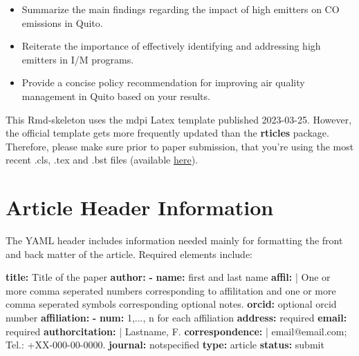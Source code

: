 \documentclass[atmosphere,article,submit,moreauthors,pdftex]{Definitions/mdpi}
\newenvironment{Shaded}{\begin{snugshade}}{\end{snugshade}}
\newcommand{\AttributeTok}[1]{\textcolor[rgb]{0.13,0.29,0.53}{#1}}
\newcommand{\CharTok}[1]{\textcolor[rgb]{0.31,0.60,0.02}{#1}}
\newcommand{\FunctionTok}[1]{\textcolor[rgb]{0.13,0.29,0.53}{\textbf{#1}}}
\newcommand{\KeywordTok}[1]{\textcolor[rgb]{0.13,0.29,0.53}{\textbf{#1}}}
\newcommand{\NormalTok}[1]{#1}
\providecommand{\tightlist}{%
  \setlength{\itemsep}{0pt}\setlength{\parskip}{0pt}}
\begin{document}
\begin{itemize}
\tightlist
\item
  Summarize the main findings regarding the impact of high emitters on
  CO emissions in Quito.
\item
  Reiterate the importance of effectively identifying and addressing
  high emitters in I/M programs.
\item
  Provide a concise policy recommendation for improving air quality
  management in Quito based on your results.
\end{itemize}

This Rmd-skeleton uses the mdpi Latex template published 2023-03-25.
However, the official template gets more frequently updated than the
\textbf{rticles} package. Therefore, please make sure prior to paper
submission, that you're using the most recent .cls, .tex and .bst files
(available \href{http://www.mdpi.com/authors/latex}{here}).

\section{Article Header Information}\label{article-header-information}

The YAML header includes information needed mainly for formatting the
front and back matter of the article. Required elements include:

\begin{Shaded}
\begin{Highlighting}[]
\FunctionTok{title}\KeywordTok{:}\AttributeTok{ Title of the paper}
\FunctionTok{author}\KeywordTok{:}
\AttributeTok{  }\KeywordTok{{-}}\AttributeTok{ }\FunctionTok{name}\KeywordTok{:}\AttributeTok{ first and last name}
\FunctionTok{    affil}\KeywordTok{: }\CharTok{|}
\NormalTok{      One or more comma seperated numbers corresponding to affilitation}
\NormalTok{      and one or more  comma seperated symbols corresponding }
\NormalTok{      optional notes.}
\AttributeTok{    }\FunctionTok{orcid}\KeywordTok{:}\AttributeTok{ optional orcid number}
\FunctionTok{affiliation}\KeywordTok{:}\AttributeTok{  }
\AttributeTok{  }\KeywordTok{{-}}\AttributeTok{ }\FunctionTok{num}\KeywordTok{:}\AttributeTok{ 1,..., n for each affiliation}
\AttributeTok{    }\FunctionTok{address}\KeywordTok{:}\AttributeTok{ required}
\AttributeTok{    }\FunctionTok{email}\KeywordTok{:}\AttributeTok{ required}
\FunctionTok{authorcitation}\KeywordTok{: }\CharTok{|}
\NormalTok{  Lastname, F.}
\FunctionTok{correspondence}\KeywordTok{: }\CharTok{|}
\NormalTok{  email@email.com; Tel.: +XX{-}000{-}00{-}0000.}
\FunctionTok{journal}\KeywordTok{:}\AttributeTok{ notspecified}
\FunctionTok{type}\KeywordTok{:}\AttributeTok{ article}
\FunctionTok{status}\KeywordTok{:}\AttributeTok{ submit}
\end{Highlighting}
\end{Shaded}
\end{document}
